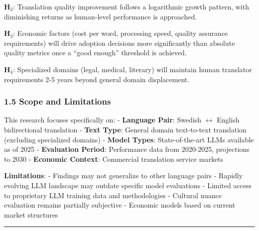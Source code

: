 \documentclass[12pt,a4paper]{article}
\begin{document}
\textbf{H$_2$}: Translation quality improvement follows a logarithmic
growth pattern, with diminishing returns as human-level performance is
approached.

\textbf{H$_3$}: Economic factors (cost per word, processing speed, quality
assurance requirements) will drive adoption decisions more significantly
than absolute quality metrics once a ``good enough'' threshold is
achieved.

\textbf{H$_4$}: Specialized domains (legal, medical, literary) will
maintain human translator requirements 2-5 years beyond general domain
displacement.

\hypertarget{scope-and-limitations}{%
\subsubsection{1.5 Scope and Limitations}\label{scope-and-limitations}}

This research focuses specifically on: - \textbf{Language Pair}: Swedish
$\leftrightarrow$ English bidirectional translation - \textbf{Text Type}: General domain
text-to-text translation (excluding specialized domains) - \textbf{Model
Types}: State-of-the-art LLMs available as of 2025 - \textbf{Evaluation
Period}: Performance data from 2020-2025, projections to 2030 -
\textbf{Economic Context}: Commercial translation service markets

\textbf{Limitations}: - Findings may not generalize to other language
pairs - Rapidly evolving LLM landscape may outdate specific model
evaluations - Limited access to proprietary LLM training data and
methodologies - Cultural nuance evaluation remains partially subjective
- Economic models based on current market structures

\begin{center}\rule{0.5\linewidth}{0.5pt}\end{center}
\end{document}
